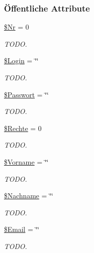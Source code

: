 \subsubsection*{\"{O}ffentliche Attribute}
\begin{CompactItemize}
\item 
\hyperlink{classMitglied_113efe44273361b7c167c729666ad04c}{\$Nr} = 0
\begin{CompactList}\small\item\em TODO. \item\end{CompactList}\item 
\hyperlink{classMitglied_626ee2f2551cc2840bdeac6a04491b2e}{\$Login} = \char`\"{}\char`\"{}
\begin{CompactList}\small\item\em TODO. \item\end{CompactList}\item 
\hyperlink{classMitglied_94f43b65c468ad42ac45be064d015446}{\$Passwort} = \char`\"{}\char`\"{}
\begin{CompactList}\small\item\em TODO. \item\end{CompactList}\item 
\hyperlink{classMitglied_adadc54a72a46a089ddec43855ba3c7e}{\$Rechte} = 0
\begin{CompactList}\small\item\em TODO. \item\end{CompactList}\item 
\hyperlink{classMitglied_157424daca1ecda5b6f6a3e0f24ecfce}{\$Vorname} = \char`\"{}\char`\"{}
\begin{CompactList}\small\item\em TODO. \item\end{CompactList}\item 
\hyperlink{classMitglied_635def9ec266748689397299c7f79d9c}{\$Nachname} = \char`\"{}\char`\"{}
\begin{CompactList}\small\item\em TODO. \item\end{CompactList}\item 
\hyperlink{classMitglied_4be6b837c482ac912188663380d31122}{\$Email} = \char`\"{}\char`\"{}
\begin{CompactList}\small\item\em TODO. \item\end{CompactList}\end{CompactItemize}


